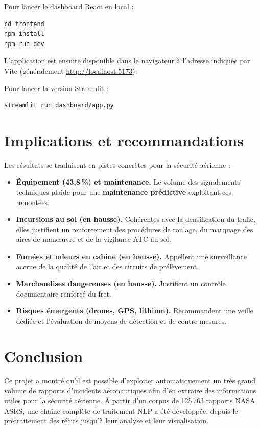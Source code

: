 \documentclass[11pt,a4paper]{article}
\begin{document}
Pour lancer le dashboard React en local :

\begin{verbatim}
cd frontend
npm install
npm run dev
\end{verbatim}

L'application est ensuite disponible dans le navigateur à l'adresse indiquée par Vite
(généralement \url{http://localhost:5173}).

Pour lancer la version Streamlit :

\begin{verbatim}
streamlit run dashboard/app.py
\end{verbatim}

\section{Implications et recommandations}

Les résultats se traduisent en pistes concrètes pour la sécurité aérienne :
\begin{itemize}
  \item \textbf{Équipement (43,8\,\%) et maintenance.} Le volume des signalements techniques
  plaide pour une \textbf{maintenance prédictive} exploitant ces remontées.
  \item \textbf{Incursions au sol (en hausse).} Cohérentes avec la densification du trafic,
  elles justifient un renforcement des procédures de roulage, du marquage des aires de
  manœuvre et de la vigilance ATC au sol.
  \item \textbf{Fumées et odeurs en cabine (en hausse).} Appellent une surveillance accrue de
  la qualité de l'air et des circuits de prélèvement.
  \item \textbf{Marchandises dangereuses (en hausse).} Justifient un contrôle documentaire
  renforcé du fret.
  \item \textbf{Risques émergents (drones, GPS, lithium).} Recommandent une veille dédiée et
  l'évaluation de moyens de détection et de contre-mesures.
\end{itemize}

\section{Conclusion}

Ce projet a montré qu'il est possible d'exploiter automatiquement un très grand volume de
rapports d'incidents aéronautiques afin d'en extraire des informations utiles pour la
sécurité aérienne. À partir d'un corpus de 125\,763 rapports NASA ASRS, une chaîne complète
de traitement NLP a été développée, depuis le prétraitement des récits jusqu'à leur analyse
et leur visualisation.
\end{document}
